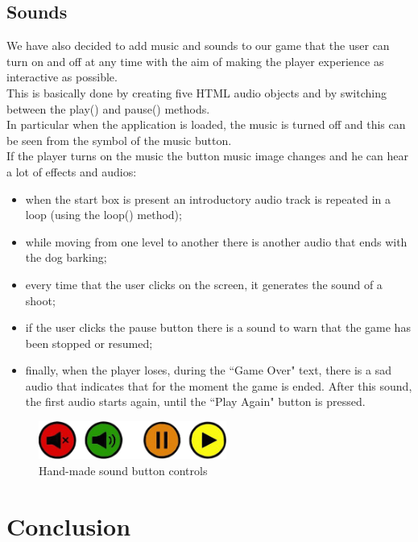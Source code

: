 \documentclass[12pt,a4paper]{article}
\begin{document}
	\subsection{Sounds}
	We have also decided to add music and sounds to our game that the user can turn on and off at any time with the aim of making the player experience as interactive as possible.\\
	This is basically done by creating five HTML audio objects and by switching between the play() and pause() methods.\\
	In particular when the application is loaded, the music is turned off and this can be seen from the symbol of the music button.\\
	If the player turns on the music the button music image changes and he can hear a lot of effects and audios:
	\begin{itemize}
		\item when the start box is present an introductory audio track is repeated in a loop (using the loop() method);
		\item while moving from one level to another there is another audio that ends with the dog barking;
		\item every time that the user clicks on the screen, it generates the sound of a shoot;
		\item if the user clicks the pause button there is a sound to warn that the game has been stopped or resumed;
		\item finally, when the player loses, during the ``Game Over" text, there is a sad audio that indicates that for the moment the game is ended. After this sound, the first audio starts again, until the ``Play Again" button is pressed.
	\end{itemize}
	\begin{figure}[hbt!]
		\centering
		\includegraphics[width=0.55\textwidth]{pulsanti}
		\caption{Hand-made sound button controls}
		\label{fig7}
	\end{figure}
	
	\section{Conclusion}
	
	
\end{document}
